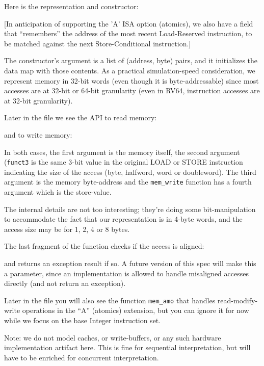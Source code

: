 \documentclass[11pt]{article}
\begin{document}
Here is the representation and constructor:



[In anticipation of supporting the 'A' ISA option (atomics), we also
have a field that ``remembers'' the address of the most recent
Load-Reserved instruction, to be matched against the next
Store-Conditional instruction.]

The constructor's argument is a list of (address, byte) pairs, and it
initializes the data map with those contents.  As a practical
simulation-speed consideration, we represent memory in 32-bit words
(even though it is byte-addressable) since most accesses are at 32-bit
or 64-bit granularity (even in RV64, instruction accesses are at
32-bit granularity).

Later in the file we see the API to read memory:



and to write memory:



In both cases, the first argument is the memory itself, the second
argument (\verb|funct3| is the same 3-bit value in the original LOAD
or STORE instruction indicating the size of the access (byte,
halfword, word or doubleword).  The third argument is the memory
byte-address and the \verb|mem_write| function has a fourth argument
which is the store-value.

The internal details are not too interesting; they're doing some
bit-manipulation to accommodate the fact that our representation is in
4-byte words, and the access size may be for 1, 2, 4 or 8 bytes.

The last fragment of the function checks if the access is aligned:



and returns an exception result if so.  A future version of this spec
will make this a parameter, since an implementation is allowed to
handle misaligned accesses directly (and not return an exception).

Later in the file you will also see the function \verb|mem_amo| that
handles read-modify-write operations in the ``A'' (atomics) extension,
but you can ignore it for now while we focus on the base Integer
instruction set.

Note: we do not model caches, or write-buffers, or any such hardware
implementation artifact here.  This is fine for sequential
interpretation, but will have to be enriched for concurrent
interpretation.
\end{document}
